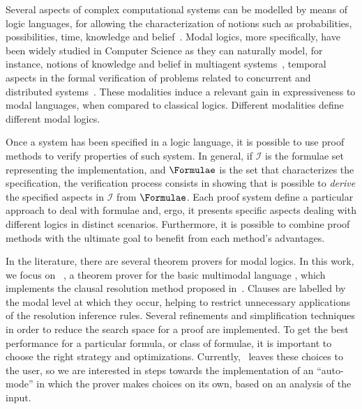 Several aspects of complex computational systems can be modelled by means of
logic languages, for allowing the characterization of notions such as
probabilities, possibilities, time, knowledge and
belief~\cite{FHMV95,HMM83,Hai82,rao:91c}. Modal logics, more specifically, have
been widely studied in Computer Science as they can naturally model, for
instance, notions of knowledge and belief in multiagent
systems~\cite{bratman1987intention,FHMV95,rao:91c}, temporal aspects in the
formal verification of problems related to concurrent and distributed
systems~\cite{HMM83,Hai82}. These modalities induce a relevant gain in
expressiveness to modal languages, when compared to classical logics. Different
modalities define different modal logics.

Once a system has been specified in a logic language, it is possible to use
proof methods to verify properties of such system. In general, if $\mathcal{I}$
is the formulae set representing the implementation, and $\Formulae$ is the set
that characterizes the specification, the verification process consists in
showing that is possible to \emph{derive} the specified aspects in $\mathcal{I}$
from $\Formulae$. Each proof system define a particular approach to deal with
formulae and, ergo, it presents specific aspects dealing with different logics
in distinct scenarios. Furthermore, it is possible to combine proof methods with
the ultimate goal to benefit from each method's advantages. 

In the literature, there are several theorem provers for modal logics. In this
work, we focus on \ksp~\cite{Nalon2016}, a theorem prover for the basic
multimodal language , which implements the clausal resolution
method proposed in~\cite{nalon2015modal}. Clauses are labelled by the modal
level at which they occur, helping to restrict unnecessary applications of the
resolution inference rules. Several refinements and simplification techniques in
order to reduce the search space for a proof are implemented. To get the best
performance for a particular formula, or class of formulae, it is important to
choose the right strategy and optimizations. Currently, \ksp~leaves these
choices to the user, so we are interested in steps towards the implementation of
an ``auto-mode'' in which the prover makes choices on its own, based on an
analysis of the input.

